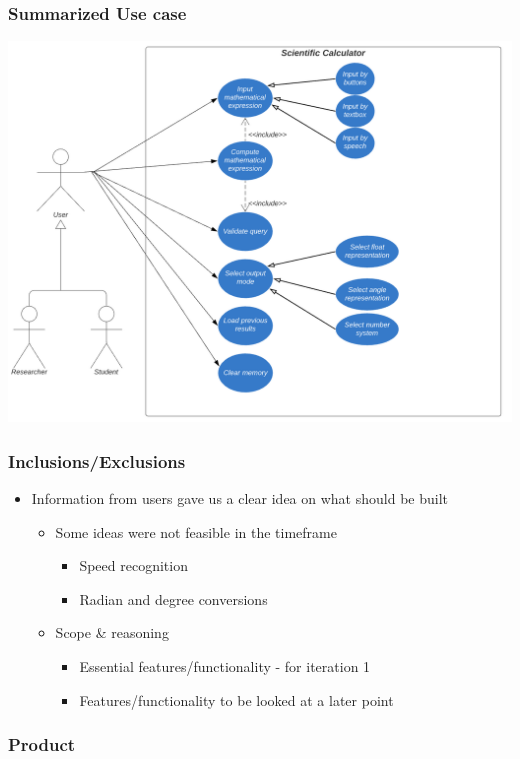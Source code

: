 \documentclass{beamer}
\begin{document}
  \begin{frame}
  \frametitle{Summarized Use case}
  \includegraphics[scale=0.5]{Use Case}
  \end{frame}


  \begin{frame}
  \frametitle{Inclusions/Exclusions}
  \begin{itemize}
   \item Information from users gave us a clear idea on what should be built
    \begin{itemize}
    \item Some ideas were not feasible in the timeframe
    \begin{itemize}
      \item Speed recognition
      \item Radian and degree conversions
    \end{itemize}
    \item Scope \& reasoning
      \begin{itemize}
      \item Essential features/functionality - for iteration 1
      \item Features/functionality to be looked at a later point
    \end{itemize}
    \end{itemize}
    \end{itemize}
  \end{frame}
  
  \begin{frame}
  \frametitle{Product}
  \end{frame}
  
\end{document}
